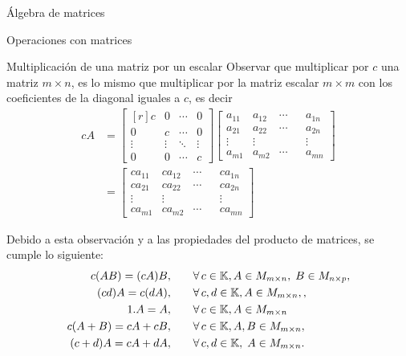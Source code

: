 \begin{chapter}{\'Algebra de matrices}
\begin{section}{Operaciones con matrices}
\begin{subsection}{Multiplicaci\'on de una matriz por un escalar}
        Observar que multiplicar por $c$ una matriz $m \times n$,  es lo mismo que multiplicar por la matriz escalar $m \times m$ con los coeficientes de la diagonal iguales a $c$,  es decir
        \begin{align*}
            cA &= \begin{bmatrix*}[r]
            c     &     0& \cdots & 0\\
            0     &     c& \cdots & 0\\
            \vdots&\vdots&  \ddots      &\vdots\\
            0     &    0  & \cdots & c
            \end{bmatrix*}
             \begin{bmatrix}
            a_{11}&a_{12}& \cdots & & a_{1n}\\
            a_{21}&a_{22}& \cdots & &a_{2n}\\
            \vdots&\vdots&  & &\vdots\\
            a_{m1}&a_{m2}& \cdots & & a_{mn}
            \end{bmatrix}  \\
            &=
             \begin{bmatrix}
            ca_{11}&ca_{12}& \cdots & & ca_{1n}\\
            ca_{21}&ca_{22}& \cdots & &ca_{2n}\\
            \vdots&\vdots&  & &\vdots\\
            ca_{m1}&ca_{m2}& \cdots & & ca_{mn}
            \end{bmatrix}
        \end{align*}
        
        Debido a esta observación y a las propiedades del producto de matrices, se cumple lo siguiente:
            \begin{align*}
             c(A B) = (cA) B,\qquad &\forall\, c \in \mathbb K,  A \in M_{m \times n}, \;B \in M_{n \times p}, \\
             (cd)A = c(dA),  \qquad &\forall\, c,d \in \mathbb K,  A \in M_{m \times n},, \\
            1.A = A ,\qquad&\forall\, c \in \mathbb K, A \in M_{m \times n}\\
            c(A + B) = cA + cB,\qquad& \forall\, c \in \mathbb K, A,B \in M_{m \times n}, \\
            (c+ d)A = cA + dA,\qquad& \forall\, c,d \in \mathbb K, \; A \in M_{m \times n}.
            \end{align*}
            

\end{subsection}
\end{section}
\end{chapter}
